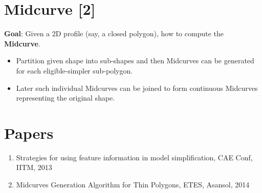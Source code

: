 \section{Midcurve [2]}
\textbf{Goal}: Given a 2D profile (say, a closed polygon), how to compute the \textbf{Midcurve}.
\begin{itemize}[noitemsep,nolistsep]
\item Partition given shape into sub-shapes and then Midcurves can be generated for each eligible-simpler sub-polygon.
\item Later such individual Midcurves can be joined to form continuous Midcurves representing the original shape.
\end{itemize}
\vskip 2mm

\section{Papers}
\begin{enumerate}
\item Strategies for using feature information in model simplification, CAE Conf, IITM, 2013
\item Midcurves Generation Algorithm for Thin Polygons, ETES, Asansol, 2014
\end{enumerate}
%
%
